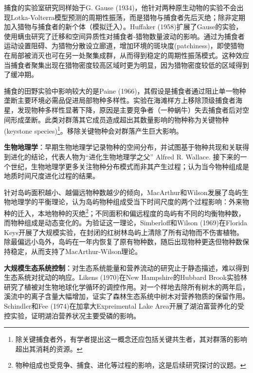 捕食的实验室研究同样始于G. Gause (1934)，他针对两种原生动物的实验不会出现Lotka-Volterra模型预测的周期性振荡，而是猎物与捕食者先后灭绝；除非定期加入猎物与捕食者的新个体（模拟迁入）。Huffaker (1958)扩展了Gause的实验，使用螨虫研究了迁移和空间异质性对捕食者-猎物数量波动的影响。通过为捕食者运动设置阻碍、为猎物分散设立廊道，增加环境的斑块度(patchiness)，即使猎物在局部被消灭也可在另一处聚集成群，从而得到稳定的周期性振荡模式。这种效应当捕食者聚集出现在猎物密度较高区域时更为明显，因为猎物密度较低的区域得到了缓冲期。

捕食的田野实验中影响较大的是Paine (1966)，其假设是捕食者通过阻止单一物种垄断主要环境必需品促进局部物种多样性。实验在海滩样方上移除顶级捕食者海星，发现物种多样性显著下降，原因是主要竞争者（一种蜗牛）失去捕食者后对空间形成垄断。此类对群落其它成员造成超出其数量影响的物种称为关键物种(keystone species)\footnote{除关键捕食者外，有学者提出这一概念还应包括关键共生者，其对群落的影响超出其消耗的资源。}。移除关键物种会对群落产生巨大影响。

\textbf{生物地理学}：早期生物地理学记录物种的空间分布，并试图基于物种共现和关联得到进化的结论，代表人物为“进化生物地理学之父” Alfred R. Wallace. 接下来的一个世纪，生物地理学更多关注物种分布模式而非其产生过程；认为当今物种组成是地质时间尺度进化过程的结果。

针对岛屿面积越小、越偏远物种数越少的倾向，MacArthur和Wilson发展了岛屿生物地理学的平衡理论，认为岛屿物种组成受当下时间尺度的两个过程影响：外来物种的迁入，本地物种的灭绝\footnote{物种组成也受竞争、捕食、进化等过程的影响，这是后续研究探讨的议题。}；不同面积和偏远程度的岛屿有不同的均衡物种数，而物种组成是动态变化的。为验证这一理论，Simberloff和Wilson (1969)在Florida Keys开展了大规模实验，在封闭的红树林岛屿上清除了所有动物而不伤害植物。除最偏远小岛外，岛屿在一年内恢复了原有物种数，随后出现物种更迭但物种数保持稳定，从而支持了MacArthur-Wilson理论。

\textbf{大规模生态系统控制}：对生态系统能量和营养流动的研究止于静态描述，难以得到生态系统对扰动的响应。Likens (1970)在New Hampshire的Hubbard Brook实验林研究了植被对生物地球化学循环的调控作用。对一个样地去除所有树木的两年后，溪流中的离子含量大幅增加，证实了森林生态系统中树木对营养物质的保留作用。Schindler和Fee (1974)在加拿大Expreimental Lake Area开展了湖泊富营养化的受控实验，证明湖泊营养状况主要受磷的影响。


